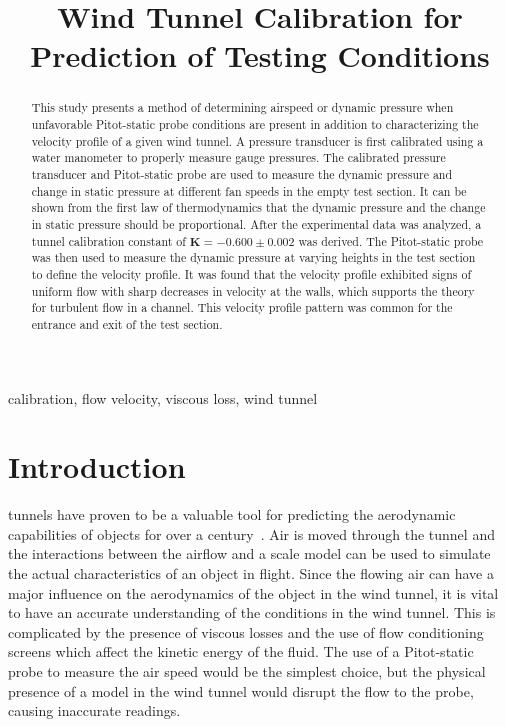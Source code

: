 \documentclass[journal,letterpaper]{IEEEtran}
\begin{document}
\title{Wind Tunnel Calibration for Prediction of Testing Conditions}

\author{
}

\maketitle
\thispagestyle{empty}

\begin{abstract}
This study presents a method of determining airspeed or dynamic pressure when unfavorable Pitot-static probe conditions are present in addition to characterizing the velocity profile of a given wind tunnel.
A pressure transducer is first calibrated using a water manometer to properly measure gauge pressures.
The calibrated pressure transducer and Pitot-static probe are used to measure the dynamic pressure and change in static pressure at different fan speeds in the empty test section.
It can be shown from the first law of thermodynamics that the dynamic pressure and the change in static pressure should be proportional.
After the experimental data was analyzed, a tunnel calibration constant of $\bm{K = -0.600 \pm 0.002}$ was derived.
The Pitot-static probe was then used to measure the dynamic pressure at varying heights in the test section to define the velocity profile.
It was found that the velocity profile exhibited signs of uniform flow with sharp decreases in velocity at the walls, which supports the theory for turbulent flow in a channel.
This velocity profile pattern was common for the entrance and exit of the test section.
\end{abstract}

\begin{IEEEkeywords}
calibration, flow velocity, viscous loss, wind tunnel
\end{IEEEkeywords}


\section{Introduction}


 tunnels have proven to be a valuable tool for predicting the aerodynamic capabilities of objects for over a century~\cite{lecture}.
Air is moved through the tunnel and the interactions between the airflow and a scale model can be used to simulate the actual characteristics of an object in flight.
Since the flowing air can have a major influence on the aerodynamics of the object in the wind tunnel, it is vital to have an accurate understanding of the conditions in the wind tunnel.
This is complicated by the presence of viscous losses and the use of flow conditioning screens which affect the kinetic energy of the fluid.
The use of a Pitot-static probe to measure the air speed would be the simplest choice, but the physical presence of a model in the wind tunnel would disrupt the flow to the probe, causing inaccurate readings.
\end{document}
